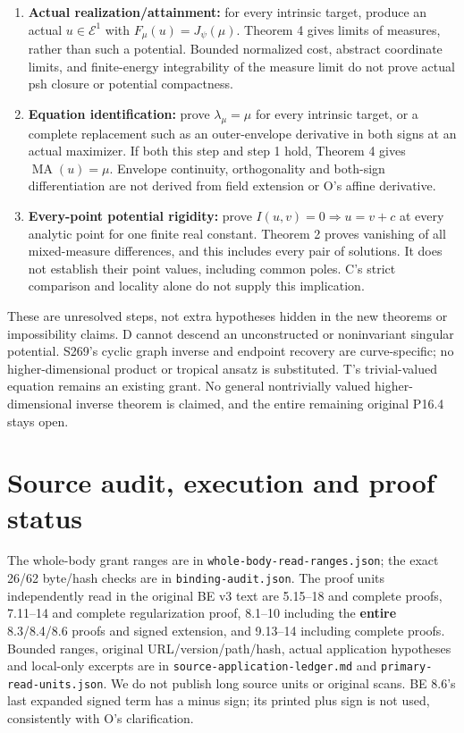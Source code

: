 \documentclass[
  11pt,
]{article}
\providecommand{\tightlist}{%
  \setlength{\itemsep}{0pt}\setlength{\parskip}{0pt}}
\begin{document}
\begin{enumerate}
\def\labelenumi{\arabic{enumi}.}
\tightlist
\item
  \textbf{Actual realization/attainment:} for every intrinsic target,
  produce an actual \(u\in\mathcal E^1\) with \(F_\mu(u)=J_\psi(\mu)\).
  Theorem 4 gives limits of measures, rather than such a potential.
  Bounded normalized cost, abstract coordinate limits, and finite-energy
  integrability of the measure limit do not prove actual psh closure or
  potential compactness.
\item
  \textbf{Equation identification:} prove \(\lambda_\mu=\mu\) for every
  intrinsic target, or a complete replacement such as an outer-envelope
  derivative in both signs at an actual maximizer. If both this step and
  step 1 hold, Theorem 4 gives \(\operatorname{MA}(u)=\mu\). Envelope
  continuity, orthogonality and both-sign differentiation are not
  derived from field extension or O's affine derivative.
\item
  \textbf{Every-point potential rigidity:} prove
  \(I(u,v)=0\Rightarrow u=v+c\) at every analytic point for one finite
  real constant. Theorem 2 proves vanishing of all mixed-measure
  differences, and this includes every pair of solutions. It does not
  establish their point values, including common poles. C's strict
  comparison and locality alone do not supply this implication.
\end{enumerate}

These are unresolved steps, not extra hypotheses hidden in the new
theorems or impossibility claims. D cannot descend an unconstructed or
noninvariant singular potential. S269's cyclic graph inverse and
endpoint recovery are curve-specific; no higher-dimensional product or
tropical ansatz is substituted. T's trivial-valued equation remains an
existing grant. No general nontrivially valued higher-dimensional
inverse theorem is claimed, and the entire remaining original P16.4
stays open.

\section{Source audit, execution and proof
status}\label{source-audit-execution-and-proof-status}

The whole-body grant ranges are in \texttt{whole-body-read-ranges.json};
the exact 26/62 byte/hash checks are in \texttt{binding-audit.json}. The
proof units independently read in the original BE v3 text are 5.15--18
and complete proofs, 7.11--14 and complete regularization proof, 8.1--10
including the \textbf{entire} 8.3/8.4/8.6 proofs and signed extension,
and 9.13--14 including complete proofs. Bounded ranges, original
URL/version/path/hash, actual application hypotheses and local-only
excerpts are in \texttt{source-application-ledger.md} and
\texttt{primary-read-units.json}. We do not publish long source units or
original scans. BE 8.6's last expanded signed term has a minus sign; its
printed plus sign is not used, consistently with O's clarification.
\end{document}

